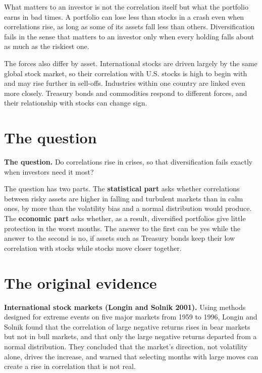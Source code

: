 What matters to an investor is not the correlation itself but what the portfolio earns in bad times. A portfolio can lose less than stocks in a crash even when correlations rise, as long as some of its assets fall less than others. Diversification fails in the sense that matters to an investor only when every holding falls about as much as the riskiest one.

The forces also differ by asset. International stocks are driven largely by the same global stock market, so their correlation with U.S. stocks is high to begin with and may rise further in sell-offs. Industries within one country are linked even more closely. Treasury bonds and commodities respond to different forces, and their relationship with stocks can change sign.


\section{The question}
\label{sec:13-claim}

\begin{callout}
\textbf{The question.} Do correlations rise in crises, so that diversification fails exactly when investors need it most?
\end{callout}

The question has two parts. The \textbf{statistical part} asks whether correlations between risky assets are higher in falling and turbulent markets than in calm ones, by more than the volatility bias and a normal distribution would produce. The \textbf{economic part} asks whether, as a result, diversified portfolios give little protection in the worst months. The answer to the first can be yes while the answer to the second is no, if assets such as Treasury bonds keep their low correlation with stocks while stocks move closer together.

\section{The original evidence}
\label{sec:13-evidence}

\textbf{International stock markets (Longin and Solnik 2001).} Using methods designed for extreme events on five major markets from 1959 to 1996, Longin and Solnik found that the correlation of large negative returns rises in bear markets but not in bull markets, and that only the large negative returns departed from a normal distribution. They concluded that the market's direction, not volatility alone, drives the increase, and warned that selecting months with large moves can create a rise in correlation that is not real.

